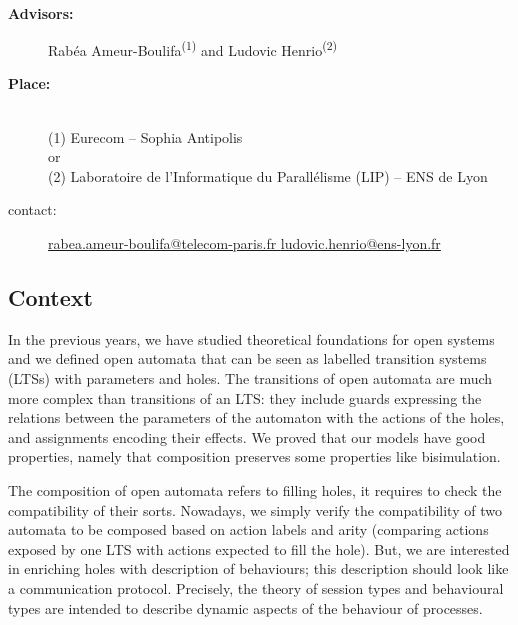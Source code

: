 \documentclass[11pt,fleqn]{article}
\begin{document}
\begin{center}
\\\bigskip
{}
\end{center}
\medskip

\begin{description}
\item[\bf Advisors:] Rabéa Ameur-Boulifa\textsuperscript{(1)} and Ludovic Henrio\textsuperscript{(2)}
\item[\bf Place:] ~\\(1) Eurecom  -- Sophia Antipolis
\\
or\\
(2) Laboratoire de l'Informatique du Parallélisme (LIP) --
  ENS de Lyon

\item[contact:]  \quad \url{rabea.ameur-boulifa@telecom-paris.fr }  \quad \qquad \url{ludovic.henrio@ens-lyon.fr}
\end{description}

\subsection*{Context}




In the previous years, we have studied theoretical foundations for open
systems and we defined  open automata \cite{arxiv-weakbisim,henrio:Forte2016,hou:hal-02406098} that can be seen as labelled transition systems (LTSs) with parameters and holes. The transitions of open
automata are much more complex than transitions of an LTS: they include guards expressing the relations between the parameters of the automaton with the actions of the holes, and assignments encoding their effects.
 We proved that our models 
have good properties, namely that composition preserves some properties like bisimulation.



The composition of open automata refers to filling holes, it requires to check the compatibility of their sorts. Nowadays, we simply verify the compatibility of two automata to be composed based on   action labels and  arity (comparing actions exposed by one LTS with actions expected to fill the hole). But, 
 we are interested in enriching holes with description of behaviours; this description should look like a communication protocol. Precisely, the theory of session types and behavioural types  \cite{Fantechi:MLTCDP2019} are intended  to describe dynamic aspects of the behaviour of processes.
\end{document}
